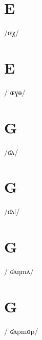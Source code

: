 \documentclass[10pt,a4paper,twoside]{book}
\begin{document}
\section*{E}

\begin{multicols}{3}
 {/ɶχ/} {}
\end{multicols}

\section*{E}

\begin{multicols}{3}
 {/ˈɶɣɵ/} {}
\end{multicols}

\section*{G}

\begin{multicols}{3}
 {/ʛʌ/} {}
\end{multicols}

\section*{G}

\begin{multicols}{3}
 {/ʛʌǀ/} {}
\end{multicols}

\section*{G}

\begin{multicols}{3}
 {/ˈʛʌŋmʌ/} {}
\end{multicols}

\section*{G}

\begin{multicols}{3}
 {/ˈʛʌpmɵp/} {}
\end{multicols}
\end{document}
